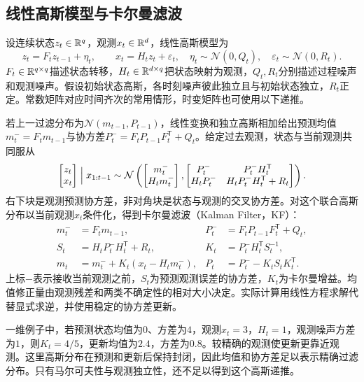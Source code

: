 \subsection{线性高斯模型与卡尔曼滤波}
设连续状态$z_t\in\mathbb{R}^q$，观测$x_t\in\mathbb{R}^d$，线性高斯模型为
\begin{equation}
 z_t=F_tz_{t-1}+\eta_t,\qquad x_t=H_tz_t+\varepsilon_t,
 \quad \eta_t\sim\mathcal N(0,Q_t),\quad
 \varepsilon_t\sim\mathcal N(0,R_t).
\end{equation}
$F_t\in\mathbb{R}^{q\times q}$描述状态转移，$H_t\in\mathbb{R}^{d\times q}$把状态映射为观测，$Q_t,R_t$分别描述过程噪声和观测噪声。假设初始状态高斯，各时刻噪声彼此独立且与初始状态独立，$R_t$正定。常数矩阵对应时间齐次的常用情形，时变矩阵也可使用以下递推。

若上一过滤分布为$\mathcal N(m_{t-1},P_{t-1})$，线性变换和独立高斯相加给出预测均值$m_t^-=F_tm_{t-1}$与协方差$P_t^-=F_tP_{t-1}F_t^{\mathsf T}+Q_t$。给定过去观测，状态与当前观测共同服从
\begin{equation}
 \begin{bmatrix}z_t\\x_t\end{bmatrix}\Bigm|x_{1:t-1}
 \sim\mathcal N\left(
 \begin{bmatrix}m_t^-\\H_tm_t^-\end{bmatrix},
 \begin{bmatrix}P_t^-&P_t^-H_t^{\mathsf T}\\
 H_tP_t^-&H_tP_t^-H_t^{\mathsf T}+R_t\end{bmatrix}\right).
\end{equation}
右下块是观测预测协方差，非对角块是状态与观测的交叉协方差。对这个联合高斯分布以当前观测$x_t$条件化，得到卡尔曼滤波（Kalman Filter，KF）\cite{kalman1960filter}：
\begin{align}
 m_t^-&=F_tm_{t-1},& P_t^-&=F_tP_{t-1}F_t^{\mathsf T}+Q_t,\\
 S_t&=H_tP_t^-H_t^{\mathsf T}+R_t,&
 K_t&=P_t^-H_t^{\mathsf T}S_t^{-1},\\
 m_t&=m_t^-+K_t(x_t-H_tm_t^-),&
 P_t&=P_t^--K_tS_tK_t^{\mathsf T}.
\end{align}
上标$-$表示接收当前观测之前，$S_t$为预测观测误差的协方差，$K_t$为卡尔曼增益。均值修正量由观测残差和两类不确定性的相对大小决定。实际计算用线性方程求解代替显式求逆，并使用稳定的协方差更新。

一维例子中，若预测状态均值为$0$、方差为$4$，观测$x_t=3$，$H_t=1$，观测噪声方差为$1$，则$K_t=4/5$，更新均值为$2.4$，方差为$0.8$。较精确的观测使更新更靠近观测。这里高斯分布在预测和更新后保持封闭，因此均值和协方差足以表示精确过滤分布。只有马尔可夫性与观测独立性，还不足以得到这个高斯递推。

